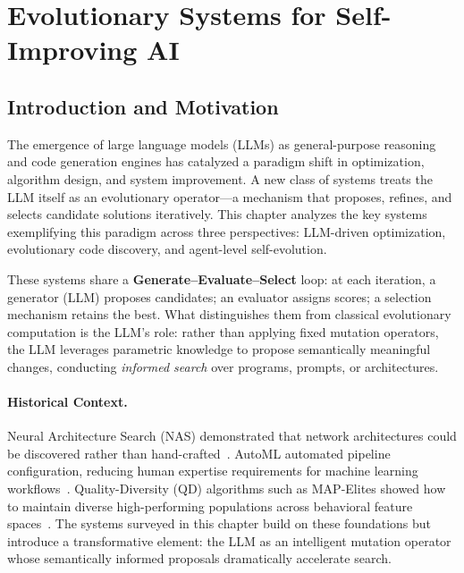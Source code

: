
\section{Evolutionary Systems for Self-Improving AI}
\label{ch:systems}

\subsection{Introduction and Motivation}

The emergence of large language models (LLMs) as general-purpose reasoning and code generation engines has catalyzed a paradigm shift in optimization, algorithm design, and system improvement. A new class of systems treats the LLM itself as an evolutionary operator---a mechanism that proposes, refines, and selects candidate solutions iteratively. This chapter analyzes the key systems exemplifying this paradigm across three perspectives: LLM-driven optimization, evolutionary code discovery, and agent-level self-evolution.

These systems share a \textbf{Generate--Evaluate--Select} loop: at each iteration, a generator (LLM) proposes candidates; an evaluator assigns scores; a selection mechanism retains the best. What distinguishes them from classical evolutionary computation is the LLM's role: rather than applying fixed mutation operators, the LLM leverages parametric knowledge to propose semantically meaningful changes, conducting \emph{informed search} over programs, prompts, or architectures.

\paragraph{Historical Context.}
Neural Architecture Search (NAS) demonstrated that network architectures could be discovered rather than hand-crafted~\citep{zoph2017neural}. AutoML automated pipeline configuration, reducing human expertise requirements for machine learning workflows~\citep{feurer2015efficient}. Quality-Diversity (QD) algorithms such as MAP-Elites showed how to maintain diverse high-performing populations across behavioral feature spaces~\citep{mouret2015illuminating}. The systems surveyed in this chapter build on these foundations but introduce a transformative element: the LLM as an intelligent mutation operator whose semantically informed proposals dramatically accelerate search.

